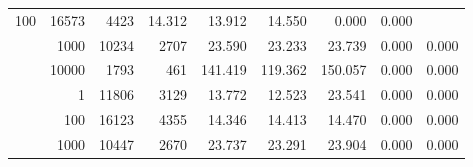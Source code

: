 \begin{table}
\begin{tabular}{rrrrrrrrr}
					\multirow{ 1 }{*}{ 100 } &
					
						
							    
							     16573  & 4423  
	                           & 14.312 & 13.912 & 14.550
	                           & 0.000 & 0.000  \\
	                
	            
					 &  
					 
					\multirow{ 1 }{*}{ 1000 } &
					
						
							    
							     10234  & 2707  
	                           & 23.590 & 23.233 & 23.739
	                           & 0.000 & 0.000  \\
	                
	            
					 &  
					 
					\multirow{ 1 }{*}{ 10000 } &
					
						
							    
							     1793  & 461  
	                           & 141.419 & 119.362 & 150.057
	                           & 0.000 & 0.000  \\
	                
	            
	        
				\noalign{\smallskip}\hline
				\multirow{ 4 }{*}{ 250000 } &
				
					
					 
					\multirow{ 1 }{*}{ 1 } &
					
						
							    
							     11806  & 3129  
	                           & 13.772 & 12.523 & 23.541
	                           & 0.000 & 0.000  \\
	                
	            
					 &  
					 
					\multirow{ 1 }{*}{ 100 } &
					
						
							    
							     16123  & 4355  
	                           & 14.346 & 14.413 & 14.470
	                           & 0.000 & 0.000  \\
	                
	            
					 &  
					 
					\multirow{ 1 }{*}{ 1000 } &
					
						
							    
							     10447  & 2670  
	                           & 23.737 & 23.291 & 23.904
	                           & 0.000 & 0.000  \\
	                

\end{tabular}
\end{table}

